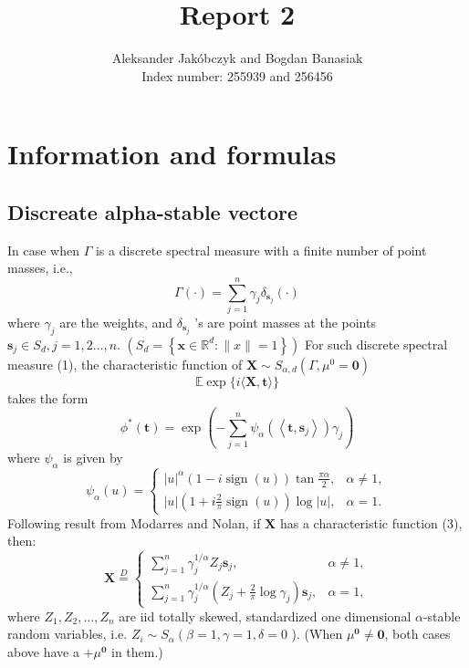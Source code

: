 \documentclass{article}
\title{Report 2}
\author{Aleksander Jakóbczyk and Bogdan Banasiak\\ 
	Index number: 255939 and 256456}
\date{}\date{}
\begin{document}
	\maketitle
	\section{Information and formulas}
	
		
	\subsection{Discreate alpha-stable vectore}
	In case when $\Gamma$ is a discrete spectral measure with a finite number of point masses, i.e.,
	$$
	\Gamma(\cdot)=\sum_{j=1}^n \gamma_j \delta_{\mathbf{s}_j}(\cdot)
	$$
	where $\gamma_j$ are the weights, and $\delta_{\mathbf{s}_j}$ 's are point masses at the points $\mathbf{s}_j \in S_d, j=1,2 \ldots, n$. $\left(S_d=\left\{\mathbf{x} \in \mathbb{R}^d:\|x\|=1\right\}\right)$
	For such discrete spectral measure (1), the characteristic function of $\mathbf{X} \sim S_{\alpha, d}\left(\Gamma, \mu^0=\mathbf{0}\right)$
	$$
	\mathbb{E} \exp \{i\langle\mathbf{X}, \mathbf{t}\rangle\}
	$$
	takes the form
	$$
	\phi^*(\mathbf{t})=\exp \left(-\sum_{j=1}^n \psi_\alpha\left(\left\langle\mathbf{t}, \mathbf{s}_j\right\rangle\right) \gamma_j\right)
	$$
	where $\psi_\alpha$ is given by
	$$
	\psi_\alpha(u)= \begin{cases}|u|^\alpha(1-i \operatorname{sign}(u)) \tan \frac{\pi \alpha}{2}, & \alpha \neq 1, \\ |u|\left(1+i \frac{2}{\pi} \operatorname{sign}(u)\right) \log |u|, & \alpha=1 .\end{cases}
	$$
	Following result from Modarres and Nolan, if $\mathbf{X}$ has a characteristic function (3), then:
	$$
	\mathbf{X} \stackrel{D}{=} \begin{cases}\sum_{j=1}^n \gamma_j^{1 / \alpha} Z_j \mathbf{s}_j, & \alpha \neq 1, \\ \sum_{j=1}^n \gamma_j^{1 / \alpha}\left(Z_j+\frac{2}{\pi} \log \gamma_j\right) \mathbf{s}_j, & \alpha=1,\end{cases}
	$$
	where $Z_1, Z_2, \ldots, Z_n$ are iid totally skewed, standardized one dimensional $\alpha$-stable random variables, i.e. $Z_i \sim S_\alpha\left(\beta=1, \gamma=1, \delta=0\right.$ ). (When $\mu^{\mathbf{0}} \neq \mathbf{0}$, both cases above have a $+\mu^{\mathbf{0}}$ in them.)
	
\end{document}
